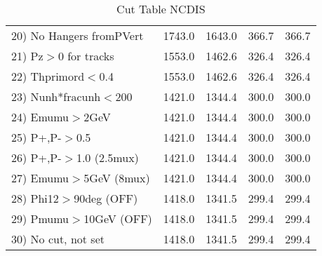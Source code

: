 \begin{table}[h!]
\begin{tabular}{||l||r|r|r|r||}
 20) No Hangers fromPVert &      1743.0 &      1643.0 &       366.7 &       366.7 \\
 21) Pz$>$0 for tracks    &      1553.0 &      1462.6 &       326.4 &       326.4 \\
 22) Thprimord$<$0.4      &      1553.0 &      1462.6 &       326.4 &       326.4 \\
 23) Nunh*fracunh$<$200   &      1421.0 &      1344.4 &       300.0 &       300.0 \\
 24) Emumu$>$2GeV         &      1421.0 &      1344.4 &       300.0 &       300.0 \\
 25) P+,P-$>$0.5          &      1421.0 &      1344.4 &       300.0 &       300.0 \\
 26) P+,P-$>$1.0 (2.5mux) &      1421.0 &      1344.4 &       300.0 &       300.0 \\
 27) Emumu$>$5GeV  (8mux) &      1421.0 &      1344.4 &       300.0 &       300.0 \\
 28) Phi12$>$90deg  (OFF) &      1418.0 &      1341.5 &       299.4 &       299.4 \\
 29) Pmumu$>$10GeV  (OFF) &      1418.0 &      1341.5 &       299.4 &       299.4 \\
 30) No cut, not set      &      1418.0 &      1341.5 &       299.4 &       299.4 \\
 \hline
 \hline
 \end{tabular}
 \caption{Cut Table  NCDIS  }
 \label{tab-cut_ncdis}
 \end{table}
